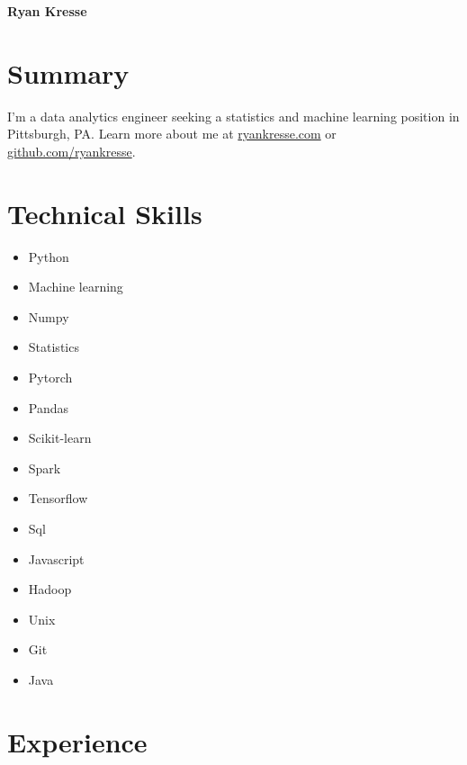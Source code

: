 \documentclass[11pt]{article}
\begin{document}
	\noindent \textbf{{\fontsize{38pt}{\parskip}\selectfont \color{RyanRed} Ryan Kresse}}
	\smallskip


	\section{Summary}
	I'm a data analytics engineer seeking a statistics and machine learning position in \newline Pittsburgh, PA. Learn more about me at \href{http://ryankresse.com/blog}{ryankresse.com} or \href{https://github.com/ryankresse}{github.com/ryankresse}.
	\section{Technical Skills}
		\begin{multicols}{4}
			\begin{itemize}
				\item Python
				\item Machine learning
				\item Numpy

				\columnbreak
				\item Statistics
				\item Pytorch
				\item Pandas
				\item Scikit-learn

				\columnbreak
				\item Spark
				\item Tensorflow
				\item Sql
				\item Javascript

				\columnbreak
				\item Hadoop
				\item Unix
				\item Git
				\item Java
				\columnbreak

			\end{itemize}
		\end{multicols}



	\section{Experience}
\end{document}
